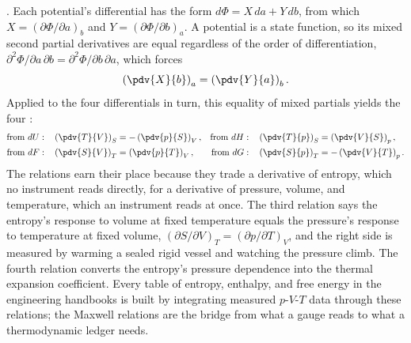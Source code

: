 . Each potential's differential has the form
$d\Phi = X\,da + Y\,db$, from which $X = (\partial \Phi/\partial a)_b$ and $Y =
(\partial \Phi/\partial b)_a$. A potential is a state function, so its mixed
second partial derivatives are equal regardless of the order of differentiation,
$\partial^2\Phi/\partial a\,\partial b = \partial^2\Phi/\partial b\,\partial a$,
which forces
\[
\left(\pdv{X}{b}\right)_a = \left(\pdv{Y}{a}\right)_b.
\]
Applied to the four differentials in turn, this equality of mixed partials yields
the four :
\begin{align*}
\text{from } dU:\quad & \left(\pdv{T}{V}\right)_S = -\left(\pdv{p}{S}\right)_V, &
\text{from } dH:\quad & \left(\pdv{T}{p}\right)_S = \left(\pdv{V}{S}\right)_p, \\
\text{from } dF:\quad & \left(\pdv{S}{V}\right)_T = \left(\pdv{p}{T}\right)_V, &
\text{from } dG:\quad & \left(\pdv{S}{p}\right)_T = -\left(\pdv{V}{T}\right)_p.
\end{align*}
The relations earn their place because they trade a derivative of entropy, which
no instrument reads directly, for a derivative of pressure, volume, and
temperature, which an instrument reads at once. The third relation says the
entropy's response to volume at fixed temperature equals the pressure's response
to temperature at fixed volume, $(\partial S/\partial V)_T = (\partial
p/\partial T)_V$, and the right side is measured by warming a sealed rigid vessel
and watching the pressure climb. The fourth relation converts the entropy's
pressure dependence into the thermal expansion coefficient. Every table of
entropy, enthalpy, and free energy in the engineering handbooks is built by
integrating measured $p$-$V$-$T$ data through these relations; the Maxwell
relations are the bridge from what a gauge reads to what a thermodynamic ledger
needs.

